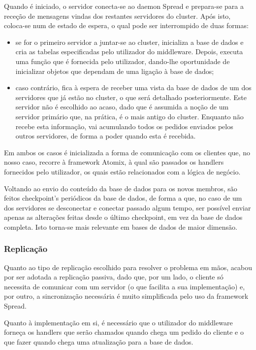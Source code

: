 \documentclass[a4paper]{report}
\begin{document}
{			Quando é iniciado, o servidor conecta-se ao daemon Spread e prepara-se para a receção de mensagens vindas dos restantes servidores do cluster. Após isto, coloca-se num de estado de espera, o qual pode ser interrompido de duas formas:
			\begin{itemize}
				\item se for o primeiro servidor a juntar-se ao cluster, inicializa a base de dados e cria as tabelas especificadas pelo utilizador do middleware. Depois, executa uma função que é fornecida pelo utilizador, dando-lhe oportunidade de inicializar objetos que dependam de uma ligação à base de dados;
				\item caso contrário, fica à espera de receber uma vista da base de dados de um dos servidores que já estão no cluster, o que será detalhado posteriormente. Este servidor não é escolhido ao acaso, dado que é assumida a noção de um servidor primário que, na prática, é o mais antigo do cluster. Enquanto não recebe esta informação, vai acumulando todos os pedidos enviados pelos outros servidores, de forma a poder quando esta é recebida.
			\end{itemize}
		
			Em ambos os casos é inicializada a forma de comunicação com os clientes que, no nosso caso, recorre à framework Atomix, à qual são passados os handlers fornecidos pelo utilizador, os quais estão relacionados com a lógica de negócio.
			
			Voltando ao envio do conteúdo da base de dados para os novos membros, são feitos checkpoint's periódicos da base de dados, de forma a que, no caso de um dos servidores se desconectar e conectar passado algum tempo, ser possível enviar apenas as alterações feitas desde o último checkpoint, em vez da base de dados completa. Isto torna-se mais relevante em bases de dados de maior dimensão.

			\subsubsection{Replicação} \label{sssec:Replication}
				Quanto ao tipo de replicação escolhido para resolver o problema em mãos, acabou por ser adotada a replicação passiva, dado que, por um lado, o cliente só necessita de comunicar com um servidor (o que facilita a sua implementação) e, por outro, a sincronização necessária é muito simplificada pelo uso da framework Spread.

				Quanto à implementação em si, é necessário que o utilizador do middleware forneça os handlers que serão chamados quando chega um pedido do cliente e o que fazer quando chega uma atualização para a base de dados. 
				
}
\end{document}

